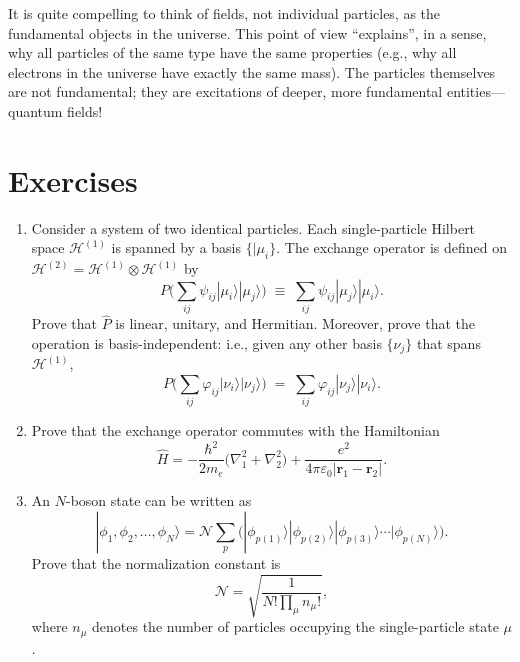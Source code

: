 \documentclass[pra,12pt]{revtex4}
\begin{document}
It is quite compelling to think of fields, not individual particles,
as the fundamental objects in the universe.  This point of view
``explains'', in a sense, why all particles of the same type have the
same properties (e.g., why all electrons in the universe have exactly
the same mass).  The particles themselves are not fundamental; they
are excitations of deeper, more fundamental entities---quantum fields!

\section*{Exercises}

\begin{enumerate}
\item Consider a system of two identical particles.  Each
  single-particle Hilbert space $\mathscr{H}^{(1)}$ is spanned by a
  basis $\{|\mu_i\}$.  The exchange operator is defined on
  $\mathscr{H}^{(2)} = \mathscr{H}^{(1)} \otimes \mathscr{H}^{(1)}$ by
  \begin{equation}
    P \Big (\sum_{ij} \psi_{ij} |\mu_i\rangle|\mu_j\rangle \Big)
    \;\equiv\;  \sum_{ij} \psi_{ij} |\mu_j\rangle|\mu_i\rangle.
  \end{equation}
  Prove that $\hat{P}$ is linear, unitary, and Hermitian.  Moreover,
  prove that the operation is basis-independent: i.e., given any other
  basis $\{\nu_j\}$ that spans $\mathscr{H}^{(1)}$,
  \begin{equation}
    P \Big (\sum_{ij} \varphi_{ij} |\nu_i\rangle|\nu_j\rangle \Big)
    \;=\;  \sum_{ij} \varphi_{ij} |\nu_j\rangle|\nu_i\rangle.
  \end{equation}
  \label{ex:1}

\item
  Prove that the exchange operator commutes with the Hamiltonian
  \begin{equation}
    \hat{H} = - \frac{\hbar^2}{2m_e} \Big(\nabla_1^2 + \nabla^2_2\Big) + \frac{e^2}{4\pi\varepsilon_0|\mathbf{r}_1 - \mathbf{r}_2|}.
  \end{equation}
  \label{ex:2}

\item
  An $N$-boson state can be written as
  \begin{equation}
    |\phi_1,\phi_2,\dots,\phi_N\rangle = \mathcal{N} \sum_p \Big(|\phi_{p(1)}\rangle  |\phi_{p(2)}\rangle  |\phi_{p(3)}\rangle  \cdots  |\phi_{p(N)}\rangle\Big).
  \end{equation}
  Prove that the normalization constant is
  \begin{equation}
    \mathcal{N} = \sqrt{\frac{1}{N!\prod_\mu n_\mu!}},
  \end{equation}
  where $n_\mu$ denotes the number of particles occupying the
  single-particle state $\mu$.
  \label{ex:boson_norm}


\end{enumerate}
\end{document}
